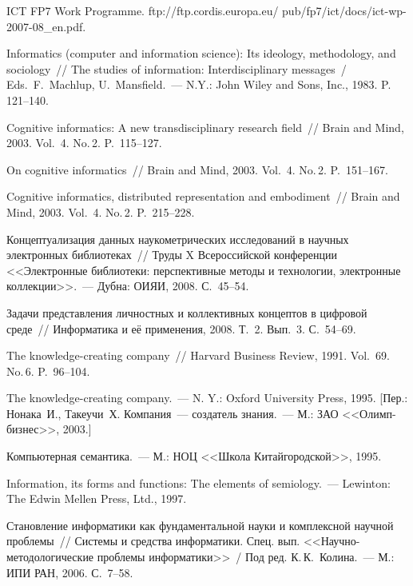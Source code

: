 \begin{multicols}{2}
{{\begin{thebibliography}{99}
     ICT FP7 Work Programme. 
     {\sf ftp://ftp.cordis.europa.eu/ pub/fp7/ict/docs/ict-wp-2007-08\_en.pdf}.
     
     Informatics (computer and information science): Its ideology, methodology, and sociology~// 
The studies of information: Interdisciplinary messages~/ Eds.\ F.~Machlup, 
     U.~Mansfield.~--- N.Y.: John Wiley and Sons, Inc., 1983. P.~ 121--140.
     
     Cognitive informatics: A new transdisciplinary research field~// Brain and Mind, 2003. 
Vol.~4. No.\,2. P.~115--127.
     
     On cognitive informatics~// Brain and Mind, 2003. Vol.~4. No.\,2. P.~151--167.
     
     Cognitive informatics, distributed representation and embodiment~// Brain and Mind, 2003. 
Vol.~4. No.\,2. P.~215--228.
     
     Концептуализация данных наукометрических исследований в научных электронных 
биб\-лио\-те\-ках~// Труды X Всероссийской конференции <<Электронные библиотеки: 
перспективные методы и технологии, электронные коллекции>>.~--- Дубна: \mbox{ОИЯИ}, 2008. 
С.~45--54.
     
     Задачи представления личностных и коллективных концептов в цифровой среде~// 
Информатика и её применения, 2008. Т.~2. Вып.~3. С.~54--69.
     
     The knowledge-creating company~// Harvard Business Review, 1991. Vol.~69. No.\,6. 
     P.~96--104.
     
     The knowledge-creating company.~--- N. Y.: Oxford University Press, 1995. [Пер.: 
     Нонака~И., Такеучи~Х. Компания~--- создатель знания.~--- М.: ЗАО 
<<Олимп-бизнес>>, 2003.]
     
     Компьютерная семантика.~--- М.: НОЦ <<Школа Китайгородской>>, 1995.
     
     Information, its forms and functions: The elements of semiology.~--- Lewinton: The Edwin 
Mellen Press, Ltd., 1997.
     
     Становление информатики как фундаментальной науки и комплексной научной 
проб\-ле\-мы~// Системы и средства информатики. Спец. вып. <<Научно-методологические 
проблемы информатики>>~/ Под ред. К.\,К.~Колина.~--- М.: ИПИ РАН, 2006. С.~7--58.
     

\end{thebibliography}}}
\end{multicols}

